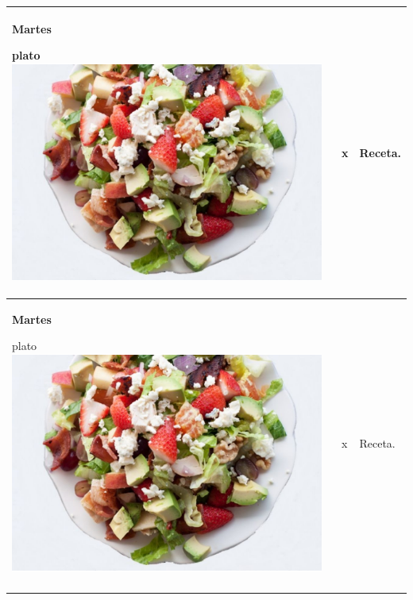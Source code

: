 \documentclass[menu.tex]{subfiles}
\begin{document}
\begin{tabular} {p{3.5cm} p{4cm} p{9cm}}
    \pbox{20cm}
    {
        \rule{0pt}{3ex}\begin{large}\textbf{Martes}\end{large}\\ 
        \rule{0pt}{2ex}plato\\
        \includegraphics[scale=0.35]{ensalada-vegetal-con-carne} 
    } & 
    \vspace{-1.75cm}            
    \begin{compactitem} 
        \begin{scriptsize}
            \item x
        \end{scriptsize}
    \end{compactitem}&
    \vspace{-1.7cm}
    Receta.\\
    \hline

    \pbox{20cm}
    {
        \rule{0pt}{3ex}\begin{large}\textbf{Martes}\end{large}\\ 
        \rule{0pt}{2ex}plato\\
        \includegraphics[scale=0.35]{ensalada-vegetal-con-carne} 
    } & 
    \vspace{-1.75cm}            
    \begin{compactitem} 
        \begin{scriptsize}
            \item x
        \end{scriptsize}
    \end{compactitem}&
    \vspace{-1.7cm}
    Receta.\\
    \hline
\newpage
\end{tabular}
\end{document}
